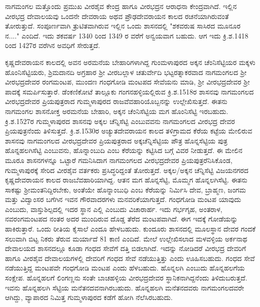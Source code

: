 ನಾಗಮಂಗಲ ಮತ್ತೊಂದು ಪ್ರಮುಖ ವೀರಶೈವ ಕೇಂದ್ರ ಹಾಗೂ ವೀರಭದ್ರನ ಆರಾಧನಾ ಕೇಂದ್ರವಾಗಿದೆ. ಇಲ್ಲಿನ ವೀರಭದ್ರ ದೇವಾಲಯವು ಒಂದನೇ ದೇವರಾಯ ಅಥವ ಪ್ರೌಢದೇವರಾಯನ ಕಾಲದ ರಚನೆಯಾಗಿರುವಂತೆ ತೋರುತ್ತುದೆ. ಸಂಪೂರ್ಣವಾಗಿ ತ್ರುಟಿತವಾಗಿರುವ ಇಲ್ಲಿನ ಒಂದು ಶಾಸನದಲ್ಲಿ "ಶಕವರುಷ ಸಾಸಿರದ ಮೂನೂರ ನ...." ಎಂದಿದೆ. ಇದು ಶಕವರ್ಷ 1340 ರಿಂದ 1349 ರ ವರೆಗೆ ಅನ್ವಯವಾಗ ಬಹುದು. ಆಗ ಇದು ಕ್ರಿ.ಶ.1418 ರಿಂದ 1427ರ ವರೆಗಿನ ಅವಧಿಗೆ ಸೇರುತ್ತದೆ.

ಕೃಷ್ಣದೇವರಾಯನ ಕಾಲದಲ್ಲಿ ಅವನ ಅರಮನೆಯ ಬೇಹಾರಿಗಳಾಗಿದ್ದ ಗುಂಮಳಾಪುರದ ಅಕ್ಕನ ಚೆಂನಿಸೆಟ್ಟಿಯರ ಮಕ್ಕಳು ಹೊಂನಿಸೆಟ್ಟಿಯರು, ಶ್ರಿಮದಾನದಿ ಅಗ್ರಹಾರ ಶ‍್ರೀ ವೀರಬಲ್ಲಾಳ ಚತುರ್ವೇದಿ ಭಟ್ಟರತ್ನಾಕರವಾದ ನಾಗಮಂಗಲದ ಶ‍್ರೀ ವೀರಭದ್ರದೇವರ ರಂಗಮಂಟಪ, ಮುಂದಣ ಗಂಧಗೋಡಿ ಮಂಟಪದ ಸೇವೆಯನು ಮಾಡಿ, ಶ‍್ರೀ ವೀರಭದ್ರದೇವರ ಶ‍್ರೀ ಪಾದಕ್ಕೆ ಸಮರ್ಪಿಸುತ್ತಾರೆ. ಡೆಂಕಣಿಕೋಟೆ ತಾಲ್ಲೂಕು ಗಂಗನಹಳ್ಳಿಯಲ್ಲಿರುವ ಕ್ರಿ.ಶ.1518ರ ಶಾಸನವು ನಾಗಮಂಗಲದ ವೀರಭದ್ರದೇವರ ಪ್ರಿಯಪುತ್ರರಾದ ಗುಮ್ಮಳಾಪುರದ ರಾಜವೆವಹಾರಿಯೊಬ್ಬನನ್ನು ಉಲ್ಲೇಖಿಸುತ್ತದೆ. ಈತನು ನಾಗಮಂಗಲ ಶಾಸನೋಕ್ತ ಅರಮನೆಯ ಬೇಹಾರಿ, ಅಕ್ಕನ ಚೆಂನಿಸೆಟ್ಟಿಯ ಮಗ ಹೊಂನಿಸೆಟ್ಟಿ ಇರಬಹುದು. ಕ್ರಿ.ಶ.1527ರ ಗುಮ್ಮಳಾಪುರದ ಶಾಸನವು ಅಕ್ಕಲ ಚೆನ್ನಿಸೆಟ್ಟಿ ಎಂಬುವವನು ನಾಗಮಂಗಲದ ವೀರಭದ್ರ ದೇವರ ಪ್ರಿಯಪುತ್ರನೆಂದು ತಿಳಿಸುತ್ತದೆ. ಕ್ರಿ.ಶ.1530ರ ಅಚ್ಯುತದೇವರಾಯನ ಕಾಲದ ತಳಿಗ್ರಾಮದ ಕೆರೆಯ ಕಟ್ಟೆಯ ಮೇಲಿರುವ ಶಾಸನವು ನಾಗಮಂಗಲದ ವೀರಭದ್ರದೇವರ ಪ್ರಿಯಪುತ್ರರಾದ ಅಕ್ಕಚೆನ್ನಿಸೆಟ್ಟಿಯ ಪೌತ್ರ ಹೊನ್ನಸೆಟ್ಟಿಯ ಪುತ್ರ ಹೊನ್ನಹಲಗಿಸೆಟ್ಟಿ ಎಂಬುವನು, ಹೊನ್ನಾಂಬುದಿ ಎಂಬ ಕೆರೆಯನ್ನು ಕಟ್ಟಿಸಿದ ಬಗ್ಗೆ ವಿವರ ನೀಡುತ್ತದೆ. ಈ ಮೇಲಿನ ಮೂರೂ ಶಾಸನಗಳನ್ನೂ ಒಟ್ಟಾರೆ ಗಮನಿಸಿದಾಗ ನಾಗಮಂಗಲದ ವೀರಭದ್ರದೇವರ ಪ್ರಿಯಪುತ್ರರೆನಿಸಿಕೊಂಡ, ಗುಮ್ಮಳಾಪುರಕ್ಕೆ ಸೇರಿದ ವೀರಶೈವ ವರ್ತಕರು ಪ್ರಸಿದ್ಧರಿದ್ದಂತೆ ತೋರುತ್ತದೆ. ಅಕ್ಕಲ/ಅಕ್ಕನ ಚೆನ್ನಿಸೆಟ್ಟಿ ವಿಜಯನಗರದ ಕೃಷ್ಣದೇವರಾಯನ ಕಾಲದ ರಾಜಬೆವಹಾರಿಯಾಗಿದ್ದ. ಆತನ ಮಗ ಹೊನ್ನಸೆಟ್ಟಿ, ಮೊಮ್ಮಗ ಹೊನ್ನಲಗಿಸೆಟ್ಟಿ. ಈತನು ಸಾಕಷ್ಟು ಶ‍್ರೀಮಂತನಿದ್ದಿರಬೇಕು, ಅಂತೆಯೇ ಹೊನ್ನಾಂಬುಧಿ ಎಂಬ ಕೆರೆಯನ್ನು ನಿರ್ಮಿಸಿ ದೇವ, ಬ್ರಾಹ್ಮಣ, ಜಂಗಮ ಮತ್ತು ವಿದ್ವಾಂಸರ ಬಗೆಗಿನ ಇವನ ಗೌರವಾದರಗಳು ಮನವರಿಕೆ\-ಯಾಗುತ್ತದೆ. ಗಂಧಗೋಡಿ ಮಂಟಪ ಯಾವುದು ಎಂಬುದು, ವಾಸ್ತುಶಿಲ್ಪದಲ್ಲಿ ಇದರ ಸ್ಥಾನ ಎಲ್ಲಿ ಎಂಬುದು ವಿಚಾರಾರ್ಹ. ಇದು ಗರ್ಭಗೃಹ, ಅಂತರಾಳ, ನವರಂಗಮಂಟಪದ ನಂತರ ಅದರ ಮುಂದಿರುವ ದೊಡ್ಡ ತೆರೆದ ಮಂಟಪವಾಗಿದೆ. ಈಗ ಇದಕ್ಕೆ ಗೋಡೆಯನ್ನು ಹಾಕಿರುತ್ತಾರೆ. ಒಂದು ರೀತಿಯ ಕೈಸಾಲೆ ಎಂದೂ ಹೇಳಬಹುದು. ಕುಂದೂರು ಶಾಸನದಲ್ಲಿ ಮೂಲಸ್ಥಾನ ದೇವರ ಗಂದಕೆ ಸಲುವಾಗಿ ಬಿಟ್ಟ ನಿಕರು ತೆರುವ ಮರ್ಯಾದೆ 81 ಕಾಣಿ ಎಂದಿದೆ. ಮೇಲೆ ಉಲ್ಲೇಖಿಸಲಾದ ಮಳವಳ್ಳಿಯ ಅರ್ಕನಾಥ ದೇವಾಲಯದ ಶಾಸನದಲ್ಲೂ ಕೂಡಾ ಗಂಧದ ಸೇವೆಗೆ ದತ್ತಿ ಬಿಡಲಾಗಿದೆ. ಇದನ್ನು ನೋಡಿದರೆ ವೀರಭದ್ರ ದೇವರಿಗೆ ಹಾಗೂ ವೀರಶೈವ ದೇವಾಲಯಗಳಲ್ಲಿ ದೇವರಿಗೆ ಗಂಧದ ಸೇವೆ ನಡೆಯುತ್ತಿತ್ತು ಎಂದು ಊಹಿಸಬಹುದು. ಗಂಧದ ಸೇವೆ ನಡೆಯುತ್ತಿದ್ದ ಮಂಟಪವೇ ಗಂಧಗೋಡಿ ಮಂಟಪ ಎಂದು ಹೆಳಬಹುದು. ಹೊನ್ನಲಗಿ ಎಂಬುದು ಹೊನ್ನಹಲಗೆಯ ಸಂಕ್ಷೇಪ. ಹೊನ್ನಹಲಗೆ ಲಿಂಗಣ್ಣನು ಸಂತೇ ಬಾಚಹಳ್ಳಿಯ ವೀರಭದ್ರದೇವರ ಸ್ಥಾನಿಕನಾಗಿದ್ದನೆಂದು ತಿಳಿದುಬರುತ್ತದೆ. ಇವನು ಹೊನ್ನಹಲಗಿ ಸೆಟ್ಟಿಯ ಮನೆತನದವನಾಗಿರಬಹುದು. ಹೊನ್ನಹಲಗಿ ಮನೆತನದವರು ನಾಗಮಂಗಲದವರೇ ಆಗಿದ್ದು, ವ್ಯಾಪಾರದ ನಿಮಿತ್ತ ಗುಮ್ಮಳಾಪುರದ ಕಡೆಗೆ ಹೋಗಿ ನೆಲೆಸಿರಬಹುದು.

